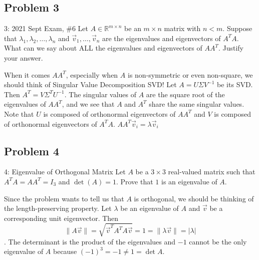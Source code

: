 \documentclass[../main]{subfiles}
\begin{document}
\subsection{Problem 3}
\begin{bbox}{{3: 2021 Sept Exam, \#6}}
Let $A \in \mathbb R^{m\times n}$ be an $m\times n$ matrix with $n < m$. Suppose that $\lambda_1,\lambda_2,\dots, \lambda_n$ and $\vec v_1,\dots, \vec v_n$ are the eigenvalues and eigenvectors of $A^TA$. What can we say about ALL the eigenvalues and eigenvectors of $AA^T$. Justify your answer.
\end{bbox}
\begin{solution}
    When it comes $AA^T$, especially when $A$ is non-symmetric or even non-square, we should think of Singular Value Decomposition SVD! Let $A = U \Sigma V^{-1}$ be its SVD. Then $A^T = V \Sigma^{T} U^{-1}$.
    The singular values of $A$ are the square root of the eigenvalues of $AA^T$, and we see that $A$ and $A^T$ share the same singular values. Note that $U$ is composed of orthonormal eigenvectors of $AA^T$ and $V$ is composed of orthonormal eigenvectors of $A^TA$. $AA^T \vec v_i = \lambda \vec v_i $
\end{solution}
\subsection{Problem 4}
\begin{bbox}{4: Eigenvalue of Orthogonal Matrix}
    Let $A$ be a $3\times 3$ real-valued matrix such that $A^T A = AA^T = I_3$ and $\det (A) = 1$. Prove that $1$ is an eigenvalue of $A$.
\end{bbox}
\begin{solution}
    Since the problem wants to tell us that $A$ is orthogonal, we should be thinking of the length-preserving property. Let $\lambda$ be an eigenvalue of $A$ and $\vec v$ be a corresponding unit eigenvector. Then 
    \[
    \|A\vec v\| = \sqrt{\vec v^T A^T A \vec v} = 1 =\|\lambda \vec v\| = |\lambda|
    \]. 
    \newline
    The determinant is the product of the eigenvalues and $-1$ cannot be the only eigenvalue of $A$ because $(-1)^3 = -1 \neq 1 = \det A$.
\end{solution}
\end{document}
